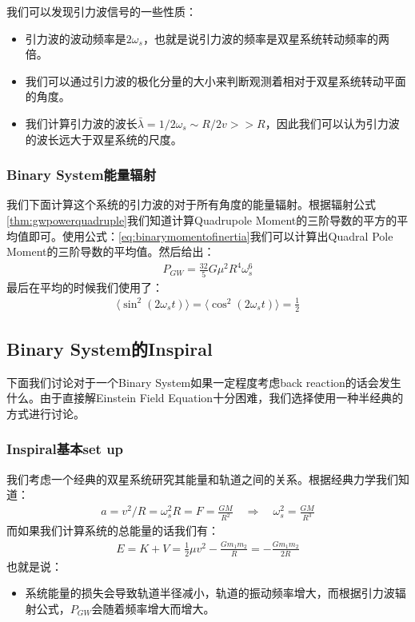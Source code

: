 \bigskip
{}

我们可以发现引力波信号的一些性质：
\begin{itemize}
  \item 引力波的波动频率是$ 2 \omega_s $，也就是说引力波的频率是双星系统转动频率的两倍。
  \item 我们可以通过引力波的极化分量的大小来判断观测着相对于双星系统转动平面的角度。
  \item 我们计算引力波的波长$ \bar{\lambda} = 1/2 \omega_s \sim R/2v >> R
    $，因此我们可以认为引力波的波长远大于双星系统的尺度。
\end{itemize}

\subsubsection{Binary System能量辐射}

我们下面计算这个系统的引力波的对于所有角度的能量辐射。根据辐射公式\cref{thm:gwpowerquadruple}我们知道计算Quadrupole
Moment的三阶导数的平方的平均值即可。使用公式：\cref{eq:binarymomentofinertia}我们可以计算出Quadral
Pole Moment的三阶导数的平均值。然后给出：
\begin{align}
  P_{GW} = \displaystyle\frac{32}{5} G \mu^2 R^4 \omega_s^6
\end{align}
最后在平均的时候我们使用了：
\begin{align}
  \langle \sin^2(2\omega_s t) \rangle = \langle \cos^2(2\omega_s t)
  \rangle = \displaystyle\frac{1}{2}
\end{align}

\subsection{Binary System的Inspiral}

下面我们讨论对于一个Binary System如果一定程度考虑back reaction的话会发生什么。由于直接解Einstein
Field Equation十分困难，我们选择使用一种半经典的方式进行讨论。

\subsubsection{Inspiral基本set up}

\bigskip
{}

我们考虑一个经典的双星系统研究其能量和轨道之间的关系。根据经典力学我们知道：
\begin{align}
  a = v^2/R = \omega_s^2 R = F= \displaystyle\frac{GM}{R^2} \quad
  \Rightarrow \quad \omega_s^2 = \displaystyle\frac{GM}{R^3}
\end{align}
而如果我们计算系统的总能量的话我们有：
\begin{align}
  E = K + V = \displaystyle\frac{1}{2} \mu v^2 - \displaystyle\frac{G
  m_1 m_2}{R} = - \displaystyle\frac{G m_1 m_2}{2R}
\end{align}
也就是说：
\begin{itemize}
  \item 系统能量的损失会导致轨道半径减小，轨道的振动频率增大，而根据引力波辐射公式，$ P_{GW} $会随着频率增大而增大。
\end{itemize}

